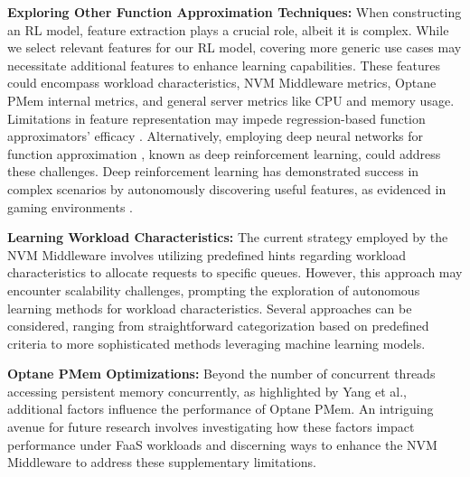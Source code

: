 \textbf{Exploring Other Function Approximation Techniques:} When constructing an RL model, feature extraction plays a crucial role, albeit it is complex. While we select relevant features for our RL model, covering more generic use cases may necessitate additional features to enhance learning capabilities. These features could encompass workload characteristics, NVM Middleware metrics, Optane PMem internal metrics, and general server metrics like CPU and memory usage. Limitations in feature representation may impede regression-based function approximators' efficacy \cite{russel2020ai}. Alternatively, employing deep neural networks for function approximation \cite{Quantit3:online}, known as deep reinforcement learning, could address these challenges. Deep reinforcement learning has demonstrated success in complex scenarios by autonomously discovering useful features, as evidenced in gaming environments \cite{mnih2013playing,silver2017mastering}.

\textbf{Learning Workload Characteristics:} The current strategy employed by the NVM Middleware involves utilizing predefined hints regarding workload characteristics to allocate requests to specific queues. However, this approach may encounter scalability challenges, prompting the exploration of autonomous learning methods for workload characteristics. Several approaches can be considered, ranging from straightforward categorization based on predefined criteria to more sophisticated methods leveraging machine learning models.

\textbf{Optane PMem Optimizations:} Beyond the number of concurrent threads accessing persistent memory concurrently, as highlighted by Yang et al., additional factors influence the performance of Optane PMem. An intriguing avenue for future research involves investigating how these factors impact performance under FaaS workloads and discerning ways to enhance the NVM Middleware to address these supplementary limitations.